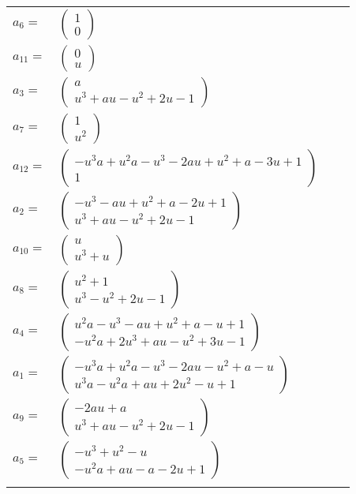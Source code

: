 \documentclass[1p]{elsarticle_modified}
\theoremstyle{definition}
\begin{document}
\begin{tabular}{m{7pt} m{180pt} m{7pt} m{180pt} }
\flushright $a_{6}=$&$\begin{pmatrix}1\\0\end{pmatrix}$ \\
\flushright $a_{11}=$&$\begin{pmatrix}0\\u\end{pmatrix}$ \\
\flushright $a_{3}=$&$\begin{pmatrix}a\\u^3+a u- u^2+2 u-1\end{pmatrix}$ \\
\flushright $a_{7}=$&$\begin{pmatrix}1\\u^2\end{pmatrix}$ \\
\flushright $a_{12}=$&$\begin{pmatrix}- u^3 a+u^2 a- u^3-2 a u+u^2+a-3 u+1\\1\end{pmatrix}$ \\
\flushright $a_{2}=$&$\begin{pmatrix}- u^3- a u+u^2+a-2 u+1\\u^3+a u- u^2+2 u-1\end{pmatrix}$ \\
\flushright $a_{10}=$&$\begin{pmatrix}u\\u^3+u\end{pmatrix}$ \\
\flushright $a_{8}=$&$\begin{pmatrix}u^2+1\\u^3- u^2+2 u-1\end{pmatrix}$ \\
\flushright $a_{4}=$&$\begin{pmatrix}u^2 a- u^3- a u+u^2+a- u+1\\- u^2 a+2 u^3+a u- u^2+3 u-1\end{pmatrix}$ \\
\flushright $a_{1}=$&$\begin{pmatrix}- u^3 a+u^2 a- u^3-2 a u- u^2+a- u\\u^3 a- u^2 a+a u+2 u^2- u+1\end{pmatrix}$ \\
\flushright $a_{9}=$&$\begin{pmatrix}-2 a u+a\\u^3+a u- u^2+2 u-1\end{pmatrix}$ \\
\flushright $a_{5}=$&$\begin{pmatrix}- u^3+u^2- u\\- u^2 a+a u- a-2 u+1\end{pmatrix}$\\&\end{tabular}
\end{document}
